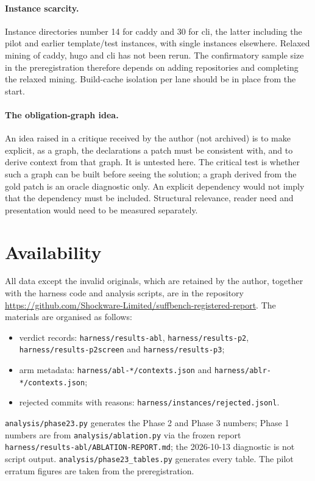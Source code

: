 \paragraph{Instance scarcity.} Instance directories number 14 for caddy and 30 for cli, the latter including the pilot and earlier template/test instances, with single instances elsewhere. Relaxed mining of caddy, hugo and cli has not been rerun. The confirmatory sample size in the preregistration therefore depends on adding repositories and completing the relaxed mining. Build-cache isolation per lane should be in place from the start.

\paragraph{The obligation-graph idea.} An idea raised in a critique received by the author (not archived) is to make explicit, as a graph, the declarations a patch must be consistent with, and to derive context from that graph. It is untested here. The critical test is whether such a graph can be built before seeing the solution; a graph derived from the gold patch is an oracle diagnostic only. An explicit dependency would not imply that the dependency must be included. Structural relevance, reader need and presentation would need to be measured separately.

\section{Availability}

All data except the invalid originals, which are retained by the author, together with the harness code and analysis scripts, are in the repository \url{https://github.com/Shockware-Limited/suffbench-registered-report}. The materials are organised as follows:
\begin{itemize}
\item verdict records: \texttt{harness/results-abl}, \texttt{harness/results-p2}, \texttt{harness/results-p2screen} and \texttt{harness/results-p3};
\item arm metadata: \texttt{harness/abl-*/contexts.json} and \texttt{harness/ablr-*/contexts.json};
\item rejected commits with reasons: \texttt{harness/instances/rejected.jsonl}.
\end{itemize}

\texttt{analysis/phase23.py} generates the Phase 2 and Phase 3 numbers; Phase 1 numbers are from \texttt{analysis/ablation.py} via the frozen report \texttt{harness/results-abl/ABLATION-REPORT.md}; the 2026-10-13 diagnostic is not script output. \texttt{analysis/phase23\_tables.py} generates every table. The pilot erratum figures are taken from the preregistration.

